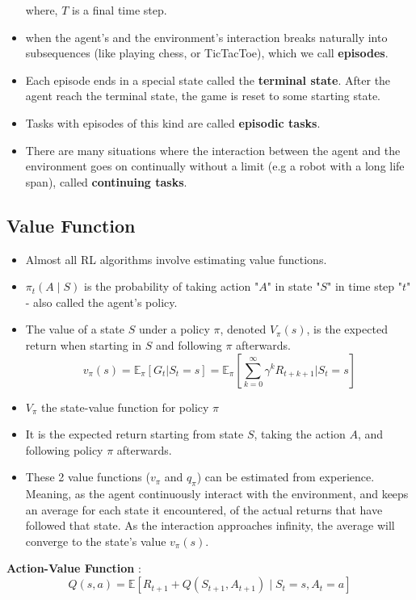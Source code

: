 \begin{itemize}
\[    \]
    where, $T$ is a final time step.
    \item when the agent’s and the environment’s interaction breaks naturally into subsequences (like playing chess, or TicTacToe), which we call \textbf{episodes}.
    \item Each episode ends in a special state called the \textbf{terminal state}. After the agent reach the terminal state, the game is reset to some starting state.
    \item Tasks with episodes of this kind are called \textbf{episodic tasks}.
    \item There are many situations where the interaction between the agent and the environment goes on continually without a limit (e.g a robot with a long life span), called \textbf{continuing tasks}.
\end{itemize}

\subsection{Value Function}
\begin{itemize}
    \item Almost all RL algorithms involve estimating value functions.
    \item $\pi_t(A \mid S)$ is the probability of taking action "$A$" in state "$S$" in time step "$t$" - also called the agent’s policy.
    \item The value of a state $S$ under a policy $\pi$, denoted $V_\pi(s)$, is the expected return when starting in $S$ and following $\pi$ afterwards.
    \[
        v_\pi(s) = \mathbb{E}_\pi \left[G_t|S_t=s\right] = \mathbb{E}_\pi\left[\sum_{k=0}^{\infty} \gamma^k R_{t+k+1} \bigg| S_t=s\right]
    \]
    \item $V_\pi$ the state-value function for policy $\pi$
    \item It is the expected return starting from state $S$, taking the action $A$, and following policy $\pi$ afterwards.
    \item These 2 value functions ($v_\pi$ and $q_\pi$) can be estimated from experience. Meaning, as the agent continuously interact with the environment, and keeps an average for each state it encountered, of the actual returns that have followed that state. As the interaction approaches infinity, the average will converge to the state’s value $v_\pi(s)$.
\end{itemize}

\textbf{Action-Value Function} \cite{medium-Kaushik_Dayalan/bellman-equation-value-functions-reinforcement-learning-b8a0a1cad84f}:
\[
    Q(s,a) = \mathbb{E}[R_{t+1} + Q(S_{t+1}, A_{t+1}) \mid S_t=s, A_t=a]
\]


